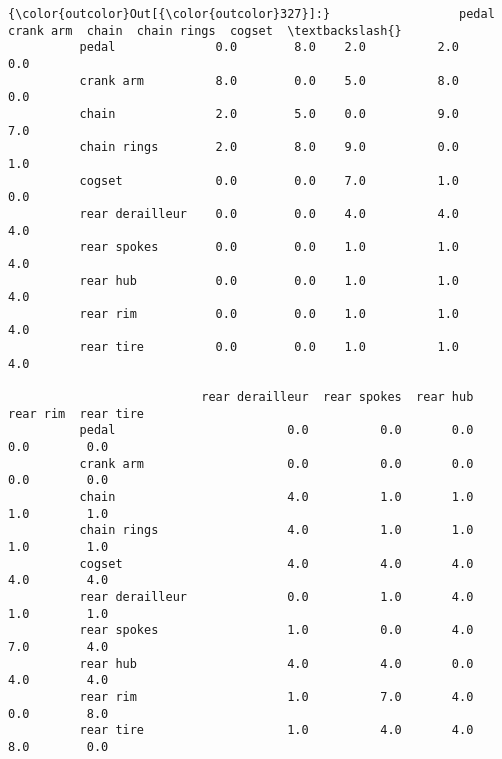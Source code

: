 \documentclass[11pt]{article}
\begin{document}
\begin{Verbatim}[commandchars=\\\{\}]
{\color{outcolor}Out[{\color{outcolor}327}]:}                  pedal  crank arm  chain  chain rings  cogset  \textbackslash{}
          pedal              0.0        8.0    2.0          2.0     0.0   
          crank arm          8.0        0.0    5.0          8.0     0.0   
          chain              2.0        5.0    0.0          9.0     7.0   
          chain rings        2.0        8.0    9.0          0.0     1.0   
          cogset             0.0        0.0    7.0          1.0     0.0   
          rear derailleur    0.0        0.0    4.0          4.0     4.0   
          rear spokes        0.0        0.0    1.0          1.0     4.0   
          rear hub           0.0        0.0    1.0          1.0     4.0   
          rear rim           0.0        0.0    1.0          1.0     4.0   
          rear tire          0.0        0.0    1.0          1.0     4.0   
          
                           rear derailleur  rear spokes  rear hub  rear rim  rear tire  
          pedal                        0.0          0.0       0.0       0.0        0.0  
          crank arm                    0.0          0.0       0.0       0.0        0.0  
          chain                        4.0          1.0       1.0       1.0        1.0  
          chain rings                  4.0          1.0       1.0       1.0        1.0  
          cogset                       4.0          4.0       4.0       4.0        4.0  
          rear derailleur              0.0          1.0       4.0       1.0        1.0  
          rear spokes                  1.0          0.0       4.0       7.0        4.0  
          rear hub                     4.0          4.0       0.0       4.0        4.0  
          rear rim                     1.0          7.0       4.0       0.0        8.0  
          rear tire                    1.0          4.0       4.0       8.0        0.0  
\end{Verbatim}
            
\end{document}
